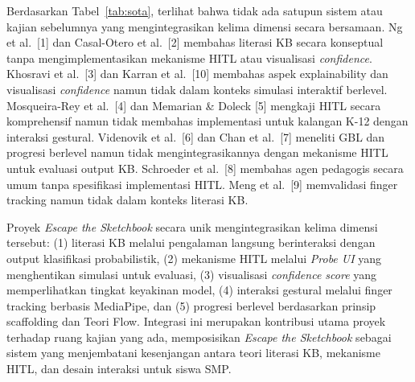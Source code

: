\documentclass[10pt,twoside,openright]{report}
\begin{document}
Berdasarkan Tabel~\ref{tab:sota}, terlihat bahwa tidak ada satupun sistem atau kajian sebelumnya yang mengintegrasikan kelima dimensi secara bersamaan. Ng et al.\ [1] dan Casal-Otero et al.\ [2] membahas literasi KB secara konseptual tanpa mengimplementasikan mekanisme HITL atau visualisasi \textit{confidence}. Khosravi et al.\ [3] dan Karran et al.\ [10] membahas aspek explainability dan visualisasi \textit{confidence} namun tidak dalam konteks simulasi interaktif berlevel. Mosqueira-Rey et al.\ [4] dan Memarian \& Doleck [5] mengkaji HITL secara komprehensif namun tidak membahas implementasi untuk kalangan K-12 dengan interaksi gestural. Videnovik et al.\ [6] dan Chan et al.\ [7] meneliti GBL dan progresi berlevel namun tidak mengintegrasikannya dengan mekanisme HITL untuk evaluasi output KB. Schroeder et al.\ [8] membahas agen pedagogis secara umum tanpa spesifikasi implementasi HITL. Meng et al.\ [9] memvalidasi finger tracking namun tidak dalam konteks literasi KB.

Proyek \textit{Escape the Sketchbook} secara unik mengintegrasikan kelima dimensi tersebut: (1) literasi KB melalui pengalaman langsung berinteraksi dengan output klasifikasi probabilistik, (2) mekanisme HITL melalui \textit{Probe UI} yang menghentikan simulasi untuk evaluasi, (3) visualisasi \textit{confidence score} yang memperlihatkan tingkat keyakinan model, (4) interaksi gestural melalui finger tracking berbasis MediaPipe, dan (5) progresi berlevel berdasarkan prinsip scaffolding dan Teori Flow. Integrasi ini merupakan kontribusi utama proyek terhadap ruang kajian yang ada, memposisikan \textit{Escape the Sketchbook} sebagai sistem yang menjembatani kesenjangan antara teori literasi KB, mekanisme HITL, dan desain interaksi untuk siswa SMP.

\end{document}
